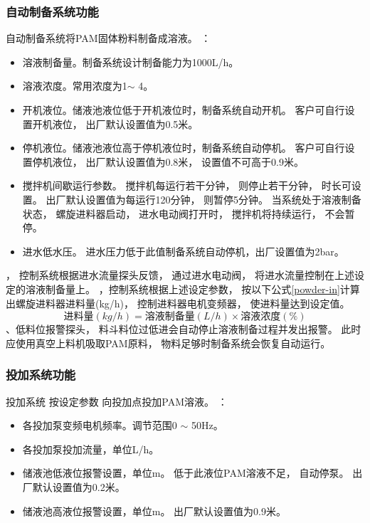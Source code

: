       \subsubsection{自动制备系统功能}
         自动制备系统将PAM固体粉料制备成溶液。
         ：
         \begin{itemize}
            \item 溶液制备量。制备系统设计制备能力为1000L/h。
            \item 溶液浓度。常用浓度为1\textperthousand $\sim$ 4\textperthousand。
            \item 开机液位。储液池液位低于开机液位时，制备系统自动开机。
               客户可自行设置开机液位，
               出厂默认设置值为0.5米。
            \item 停机液位。储液池液位高于停机液位时，制备系统自动停机。
               客户可自行设置停机液位，
               出厂默认设置值为0.8米，
               设置值不可高于0.9米。
            \item 搅拌机间歇运行参数。
            搅拌机每运行若干分钟，
            则停止若干分钟，
            时长可设置。
            出厂默认设置值为每运行120分钟，
            则暂停5分钟。
            当系统处于溶液制备状态，
            螺旋进料器启动，
            进水电动阀打开时，
            搅拌机将持续运行，
            不会暂停。
            \item 进水低水压。
            进水压力低于此值制备系统自动停机，出厂设置值为2bar。
         \end{itemize}
         ，
         控制系统根据进水流量探头反馈，
         通过进水电动阀，
         将进水流量控制在上述设定的溶液制备量上。
         ，控制系统根据上述设定参数，
         按以下公式\ref{powder-in}计算出螺旋进料器进料量(kg/h)，
         控制进料器电机变频器，
         使进料量达到设定值。
         \begin{equation}
            \label{powder-in}
            \mbox{进料量}(kg/h) = \mbox{溶液制备量}(L/h)  \times \mbox{溶液浓度} (\%)
         \end{equation}
         、低料位报警探头，
         料斗料位过低进会自动停止溶液制备过程并发出报警。
         此时应使用真空上料机吸取PAM原料，
         物料足够时制备系统会恢复自动运行。

      \subsubsection{投加系统功能}
         投加系统
         按设定参数
         向投加点投加PAM溶液。
         ：
         \begin{itemize}
            \item 各投加泵变频电机频率。调节范围0 $\sim$ 50Hz。
            \item 各投加泵投加流量，单位L/h。
            \item 储液池低液位报警设置，单位m。
            低于此液位PAM溶液不足，
            自动停泵。
               出厂默认设置值为0.2米。
            \item 储液池高液位报警设置，单位m。
               出厂默认设置值为0.9米。
         \end{itemize}

